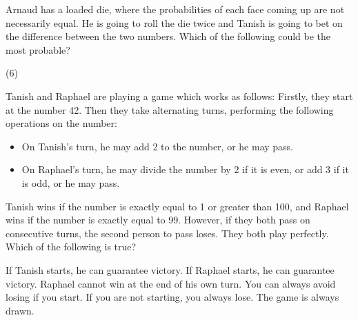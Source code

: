 \documentclass{article}
\begin{document}
\begin{problem}
Arnaud has a loaded die, where the probabilities of each face coming up are not necessarily equal. He is going to roll the die twice and Tanish is going to bet on the difference between the two numbers. Which of the following could be the most probable?
\end{problem}
\begin{tasks}(6)
\end{tasks}

\begin{problem}
Tanish and Raphael are playing a game which works as follows: Firstly, they start at the number 42. Then they take alternating turns, performing the following operations on the number: 
\begin{itemize}
    \item On Tanish's turn, he may add 2 to the number, or he may pass.
    \item On Raphael's turn, he may divide the number by 2 if it is even, or add 3 if it is odd, or he may pass.  
\end{itemize}
Tanish wins if the number is exactly equal to 1 or greater than 100, and Raphael wins if the number is exactly equal to 99.  However, if they both pass on consecutive turns, the second person to pass loses. They both play perfectly.
Which of the following is true?
\begin{tasks}
\task If Tanish starts, he can guarantee victory.
\task If Raphael starts, he can guarantee victory.
\task Raphael cannot win at the end of his own turn. 
\task You can always avoid losing if you start.
\task If you are not starting, you always lose.
\task The game is always drawn. 
\end{tasks}
\end{problem}
\end{document}
